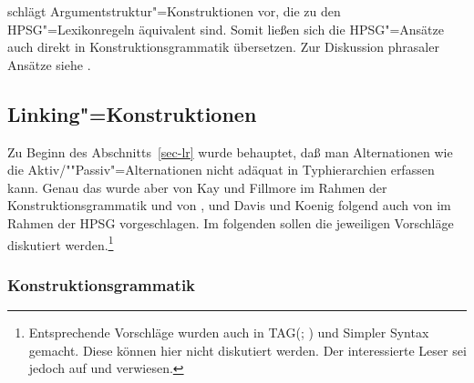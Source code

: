 \citet{Kay2005a} schlägt Argumentstruktur"=Konstruktionen vor,
die zu den HPSG"=Lexikonregeln äquivalent sind. Somit ließen sich die HPSG"=Ansätze auch direkt
in Konstruktionsgrammatik übersetzen.
Zur Diskussion phrasaler Ansätze siehe .
%

\subsection{Linking"=Konstruktionen}
\label{cxg-hpsg-linking-konstruktionen}

Zu Beginn des Abschnitts~\ref{sec-lr} wurde behauptet, daß man Alternationen wie die
Aktiv/""Passiv"=Alternationen nicht adäquat in Typhierarchien erfassen kann. 
Genau das wurde aber von Kay und Fillmore im Rahmen der Konstruktionsgrammatik und 
von \citet{Koenig99a}, \citet{DK2000b-u} und Davis und Koenig folgend
auch von \citet{Kordoni2001b-u} im Rahmen der HPSG vorgeschlagen. Im
folgenden sollen die jeweiligen Vorschläge diskutiert werden.\footnote{
  Entsprechende Vorschläge wurden auch in TAG\indextag (\citealp{Candito96a}; \citealp[]{CK2003a-u}) und Simpler Syntax \citep[Kapitel~6.3]{CJ2005a} gemacht. Diese können hier nicht diskutiert werden. Der interessierte Leser sei jedoch auf  und  verwiesen.
}

\subsubsection{Konstruktionsgrammatik}
\label{cxg-linking-konstruktionen}

